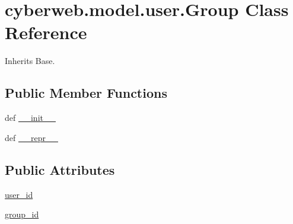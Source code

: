 \hypertarget{classcyberweb_1_1model_1_1user_1_1_group}{\section{cyberweb.\-model.\-user.\-Group \-Class \-Reference}
\label{classcyberweb_1_1model_1_1user_1_1_group}
}


\-Inherits \-Base.

\subsection*{\-Public \-Member \-Functions}
\begin{DoxyCompactItemize}
\item 
def \hyperlink{classcyberweb_1_1model_1_1user_1_1_group_a8a7f46b1acd3a7bb622de8d2cd2f4597}{\-\_\-\-\_\-init\-\_\-\-\_\-}
\item 
def \hyperlink{classcyberweb_1_1model_1_1user_1_1_group_a09a6013724c62901e22b926350a67867}{\-\_\-\-\_\-repr\-\_\-\-\_\-}
\end{DoxyCompactItemize}
\subsection*{\-Public \-Attributes}
\begin{DoxyCompactItemize}
\item 
\hyperlink{classcyberweb_1_1model_1_1user_1_1_group_aacb186c6ff7d713002e50f2ebcb9dd93}{user\-\_\-id}
\item 
\hyperlink{classcyberweb_1_1model_1_1user_1_1_group_a19fa4782728159211e1f30928dff2b04}{group\-\_\-id}
\end{DoxyCompactItemize}
